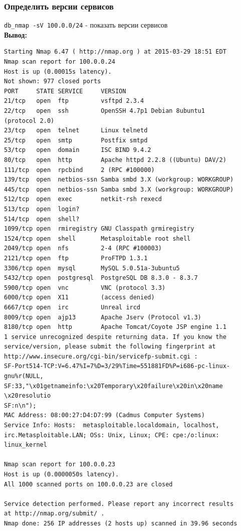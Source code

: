\documentclass[12pt,a4paper]{article}
\begin{document}
\subsubsection{Определить версии сервисов}
\verb+db_nmap -sV 100.0.0/24+ - показать версии сервисов\\

\textbf{Вывод:}

\begin{lstlisting}
Starting Nmap 6.47 ( http://nmap.org ) at 2015-03-29 18:51 EDT
Nmap scan report for 100.0.0.24
Host is up (0.00015s latency).
Not shown: 977 closed ports
PORT     STATE SERVICE     VERSION
21/tcp   open  ftp         vsftpd 2.3.4
22/tcp   open  ssh         OpenSSH 4.7p1 Debian 8ubuntu1
(protocol 2.0)
23/tcp   open  telnet      Linux telnetd
25/tcp   open  smtp        Postfix smtpd
53/tcp   open  domain      ISC BIND 9.4.2
80/tcp   open  http        Apache httpd 2.2.8 ((Ubuntu) DAV/2)
111/tcp  open  rpcbind     2 (RPC #100000)
139/tcp  open  netbios-ssn Samba smbd 3.X (workgroup: WORKGROUP)
445/tcp  open  netbios-ssn Samba smbd 3.X (workgroup: WORKGROUP)
512/tcp  open  exec        netkit-rsh rexecd
513/tcp  open  login?
514/tcp  open  shell?
1099/tcp open  rmiregistry GNU Classpath grmiregistry
1524/tcp open  shell       Metasploitable root shell
2049/tcp open  nfs         2-4 (RPC #100003)
2121/tcp open  ftp         ProFTPD 1.3.1
3306/tcp open  mysql       MySQL 5.0.51a-3ubuntu5
5432/tcp open  postgresql  PostgreSQL DB 8.3.0 - 8.3.7
5900/tcp open  vnc         VNC (protocol 3.3)
6000/tcp open  X11         (access denied)
6667/tcp open  irc         Unreal ircd
8009/tcp open  ajp13       Apache Jserv (Protocol v1.3)
8180/tcp open  http        Apache Tomcat/Coyote JSP engine 1.1
1 service unrecognized despite returning data. If you know the
service/version, please submit the following fingerprint at
http://www.insecure.org/cgi-bin/servicefp-submit.cgi :
SF-Port514-TCP:V=6.47%I=7%D=3/29%Time=551881FD%P=i686-pc-linux-
gnu%r(NULL,
SF:33,"\x01getnameinfo:\x20Temporary\x20failure\x20in\x20name
\x20resolutio
SF:n\n");
MAC Address: 08:00:27:D4:D7:99 (Cadmus Computer Systems)
Service Info: Hosts:  metasploitable.localdomain, localhost,
irc.Metasploitable.LAN; OSs: Unix, Linux; CPE: cpe:/o:linux:
linux_kernel

Nmap scan report for 100.0.0.23
Host is up (0.0000050s latency).
All 1000 scanned ports on 100.0.0.23 are closed

Service detection performed. Please report any incorrect results
at http://nmap.org/submit/ .
Nmap done: 256 IP addresses (2 hosts up) scanned in 39.96 seconds
\end{lstlisting}
\newpage
\end{document}
